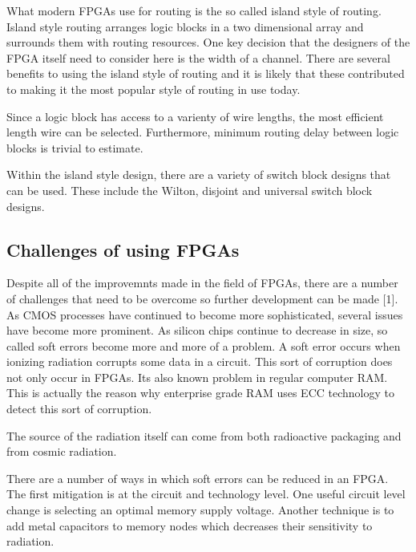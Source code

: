 \documentclass{article}
\begin{document}
    What modern FPGAs use for routing is the so called island style of routing.
    Island style routing arranges logic blocks in a two dimensional array and surrounds
    them with routing resources. One key decision that the designers of the FPGA itself
    need to consider here is the width of a channel.
    There are several benefits to using the island style of routing and it is likely
    that these contributed to making it the most popular style of routing in use today.

    Since a logic block has access to a varienty of wire lengths, the most efficient length
    wire can be selected. Furthermore, minimum routing delay between logic blocks is trivial
    to estimate.

    Within the island style design, there are a variety of switch block designs that
    can be used. These include the Wilton, disjoint and universal switch block designs.
    
    \subsection{Challenges of using FPGAs}

    Despite all of the improvemnts made in the field of FPGAs, there are a number of challenges
    that need to be overcome so further development can be made [1]. As CMOS processes
    have continued to become more sophisticated, several issues have become more prominent.
    As silicon chips continue to decrease in size, so called soft errors become more and more
    of a problem. A soft error occurs when ionizing radiation corrupts some data in a circuit.
    This sort of corruption does not only occur in FPGAs. Its also known problem in
    regular computer RAM. This is actually the reason why enterprise grade RAM uses
    ECC technology to detect this sort of corruption.

    The source of the radiation itself can come from both radioactive packaging and
    from cosmic radiation.

    There are a number of ways in which soft errors can be reduced in an FPGA.
    The first mitigation is at the circuit and technology level.
    One useful circuit level change is selecting an optimal memory supply voltage.
    Another technique is to add metal capacitors to memory nodes which
    decreases their sensitivity to radiation.
\end{document}
